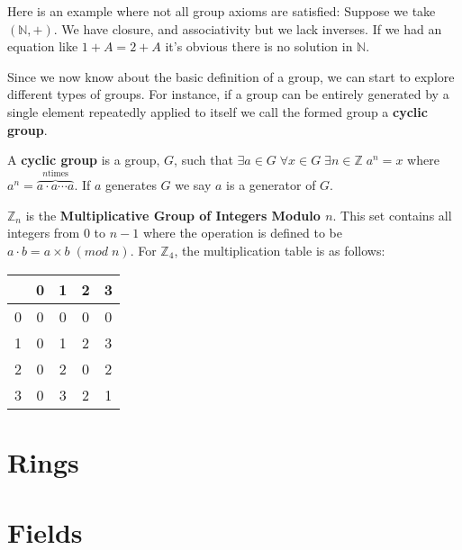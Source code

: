 \begin{ex}
  Here is an example where not all group axioms are satisfied:
  Suppose we take $(\mathbb{N}, +)$.
  We have closure, and associativity but we lack inverses.
  If we had an equation like $1+A=2+A$ it's obvious there is no solution in $\mathbb{N}$.
\end{ex}

Since we now know about the basic definition of a group, we can start to explore different types of groups.
For instance, if a group can be entirely generated by a single element repeatedly applied to itself we call the formed group a \textbf{cyclic group}.

\begin{defn}
\label{defn:cyclicGroup}
  A \textbf{cyclic group} is a group, $G$, such that $\exists a \in G \; \forall x \in G \; \exists n \in \mathbb{Z} \; a^n = x$ where $a^n = \overbrace{a \cdot a \cdots a}^{n\text{times}}$.
  If $a$ generates $G$ we say $a$ is a generator of $G$.
\end{defn}

\begin{ex}
  $\mathbb{Z}_n$ is the \textbf{Multiplicative Group of Integers Modulo $n$}.
  This set contains all integers from $0$ to $n-1$ where the operation is defined to be $a \cdot b = a \times b \; (mod \; n)$.
  For $\mathbb{Z}_4$, the multiplication table is as follows:

  \begin{center}
  \begin{tabular}{c|cccc}
      & 0 & 1 & 2 & 3 \\
    \toprule
    0 & 0 & 0 & 0 & 0 \\
    1 & 0 & 1 & 2 & 3 \\
    2 & 0 & 2 & 0 & 2 \\
    3 & 0 & 3 & 2 & 1
  \end{tabular}
  \end{center}

\end{ex}



\section{Rings}

\section{Fields}

